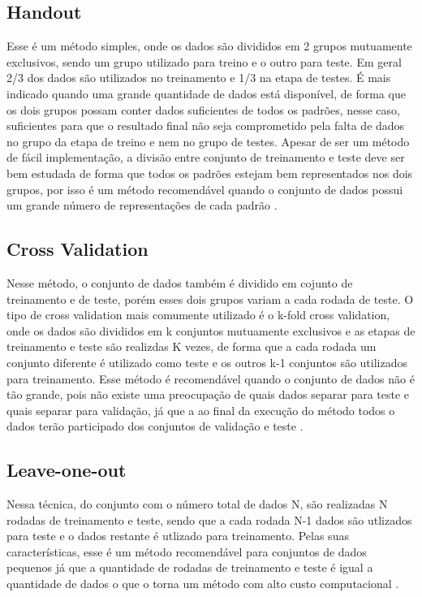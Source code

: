 \subsection{Handout}
Esse é um método simples, onde os dados são divididos em 2 grupos mutuamente exclusivos, sendo um grupo utilizado para treino e o outro para teste. Em geral 2/3 dos dados são utilizados no treinamento e 1/3 na etapa de testes. É mais indicado quando uma grande quantidade de dados está disponível, de forma que os dois grupos possam conter dados suficientes de todos os padrões, nesse caso, suficientes para que o resultado final não seja comprometido pela falta de dados no grupo da etapa de treino e nem no grupo de testes. Apesar de ser um método de fácil implementação, a divisão entre conjunto de treinamento e teste deve ser bem estudada de forma que todos os padrões estejam bem representados nos dois grupos, por isso é um método recomendável quando o conjunto de dados possui um grande número de representações de cada padrão \cite{Kohavi95Cross} \cite{Baldisserotto05Validacao}.

\subsection {Cross Validation}
Nesse método, o conjunto de dados também é dividido em cojunto de treinamento e de teste, porém esses dois grupos variam a cada rodada de teste. O tipo de cross validation mais comumente utilizado é o k-fold cross validation, onde os dados são divididos em k conjuntos mutuamente exclusivos e as etapas de treinamento e teste são realizdas K vezes, de forma que a cada rodada um conjunto diferente é utilizado como teste e os outros k-1 conjuntos são utilizados para treinamento. Esse método é recomendável quando o conjunto de dados não é tão grande, pois não existe uma  preocupação de quais dados separar para teste e quais separar para validação, já que a ao final da execução do método todos o dados terão participado dos conjuntos de validação e teste \cite{Kohavi95Cross} \cite{Baldisserotto05Validacao}.

\subsection{Leave-one-out}
Nessa técnica, do conjunto com o número total de dados N, são realizadas N rodadas de treinamento e teste, sendo que a cada rodada N-1 dados são utlizados para teste e o dados restante é utlizado para treinamento. Pelas suas características, esse é um método recomendável para conjuntos de dados pequenos já que a quantidade de rodadas de treinamento e teste é igual a quantidade de dados o que o torna um método com alto custo computacional \cite{Kohavi95Cross} \cite{Baldisserotto05Validacao}.
